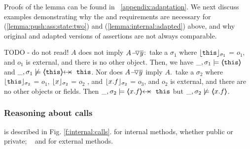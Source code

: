 Proofs of the lemma can be found in \A\ \ref{appendix:adaptation}. We next discuss examples demonstrating why the  and  requirements are necessary for (\ref{lemma:push:ass:state:two}) and (\ref{lemma:internal:adapted}) above, and why  original and adapted versions of assertions are not always comparable.

\begin{example} TODO - do not read!
\label{push:does:not:imply}
\notesep   $A$ does not imply $\PushAS {y} {A}$:\  \Eg  take 
  a   $\sigma_1$ where $\interpret {\sigma_1} {\prg{this}}$ = $o_1$, and $o_1$ is {external},  and there is no other object. Then, we have
$\_,\sigma_1 \models \inside {\prg{this}}$ and $\_,\sigma_1 \not\models \protectedFrom {\prg{this}} {\prg{this}}$.
\notesep Nor does  $\PushAS {y} {A}$  imply $A$.\  \Eg  take a $\sigma_2$ where $\interpret {\sigma_2} {\prg{this}}$ = $o_1$,
 $\interpret {\sigma_2} {x}$ = $o_2$ , and  $\interpret {\sigma_2} {x.f}$ = $o_3$, and $o_2$ is external, and there are no other objects or fields.
 Then $\_,\sigma_2 \models   \protectedFrom {x.f} {\prg{this}}$ but  $\_,\sigma_2 \not\models \inside {x.f}$.
\end{example}






\subsubsection{Reasoning about   calls}
\label{s:calls}
is described in Fig. \ref{f:internal:calls}. {}  %
 for internal methods, whether public or private; \ %
and {} for  external methods.




